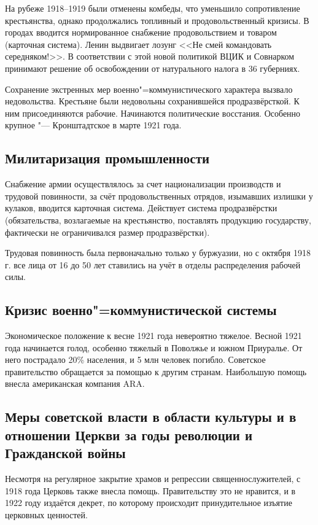 На рубеже 1918--1919 были отменены комбеды, что уменьшило сопротивление крестьянства, однако продолжались топливный и продовольственный кризисы. В городах вводится нормированное снабжение продовольствием и товаром (карточная система). Ленин выдвигает лозунг <<Не смей командовать середняком!>>. В соответствии с этой новой политикой ВЦИК и Совнарком принимают решение об освобождении от натурального налога в 36 губерниях.

Сохранение экстренных мер военно"=коммунистического характера вызвало недовольства. Крестьяне были недовольны сохранившейся продразвёрсткой. К ним присоединяются рабочие. Начинаются политические восстания. Особенно крупное "--- Кронштадтское в марте 1921 года.

\subsection{Милитаризация промышленности}

Снабжение армии осуществлялось за счет национализации производств и трудовой повинности, за счёт продовольственных отрядов, изымавших излишки у кулаков, вводится карточная система. Действует система продразвёрстки (обязательства, возлагаемые на крестьянство, поставлять продукцию государству, фактически не ограничивался размер продразвёрстки).

Трудовая повинность была первоначально только у буржуазии, но с октября 1918 г. все лица от 16 до 50 лет ставились на учёт в отделы распределения рабочей силы.

\subsection{Кризис военно"=коммунистической системы}
Экономическое положение к весне 1921 года невероятно тяжелое. Весной 1921 года начинается голод, особенно тяжелый в Поволжье и южном Приуралье. От него пострадало 20\% населения, и 5 млн человек погибло. Советское правительство обращается за помощью к другим странам. Наибольшую помощь внесла американская компания ARA.

\subsection{Меры советской власти в области культуры и в отношении Церкви за годы революции и Гражданской войны}

Несмотря на регулярное закрытие храмов и репрессии священнослужителей, с 1918 года Церковь также внесла помощь. Правительству это не нравится, и в 1922 году издаётся декрет, по которому происходит принудительное изъятие церковных ценностей.

